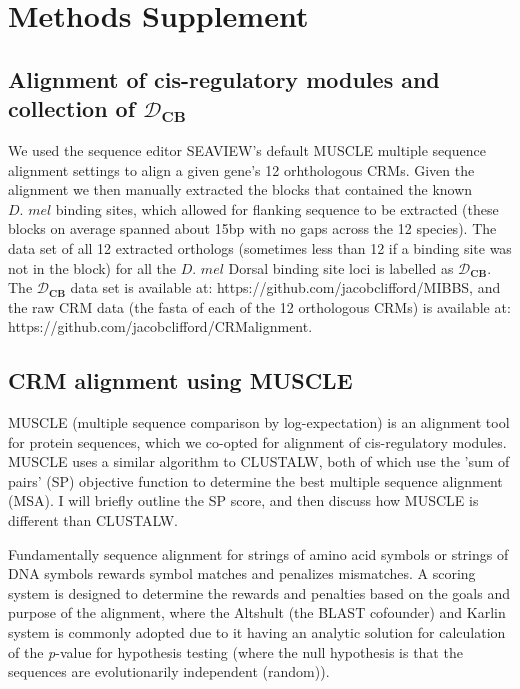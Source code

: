\section{Methods Supplement}


\subsection{ Alignment of cis-regulatory modules and collection of $\mathcal D_{\textbf{CB}}$} \label{muscle}
	We used the sequence editor SEAVIEW's default MUSCLE multiple sequence alignment settings \cite{pmid9021275} to align a given gene's 12 orhthologous CRMs\cite{BSA}.  Given the alignment we then manually extracted the blocks that contained the known $\textit{D. mel}$ binding sites, which allowed for flanking sequence to be extracted (these blocks on average spanned about 15bp with no gaps across the 12 species).  The data set of all 12 extracted orthologs (sometimes less than 12 if a binding site was not in the block) for all the $\textit{D. mel}$ Dorsal binding site loci is labelled as $\mathcal D_{\textbf{CB}}$.  The $\mathcal D_{\textbf{CB}}$ data set is available at: https://github.com/jacobclifford/MIBBS, and the raw CRM data (the fasta of each of the 12 orthologous CRMs) is available at:  https://github.com/jacobclifford/CRMalignment.
	
\subsection{CRM alignment using MUSCLE}
MUSCLE (multiple sequence comparison by log-expectation) is an alignment tool for protein sequences, which we co-opted for alignment of cis-regulatory modules.  MUSCLE uses a similar algorithm to CLUSTALW, both of which use the 'sum of pairs' (SP) objective function to determine the best multiple sequence alignment (MSA).  I will briefly outline the SP score, and then discuss how MUSCLE is different than CLUSTALW. 

  Fundamentally sequence alignment for strings of amino acid symbols or strings of DNA symbols rewards symbol matches and penalizes mismatches.  A scoring system is designed to determine the rewards and penalties based on the goals and purpose of the alignment, where the Altshult (the BLAST cofounder) and Karlin system is commonly adopted due to it having an analytic solution for calculation of the \textit{p}-value for hypothesis testing (where the null hypothesis is that the sequences are evolutionarily independent (random)).  

